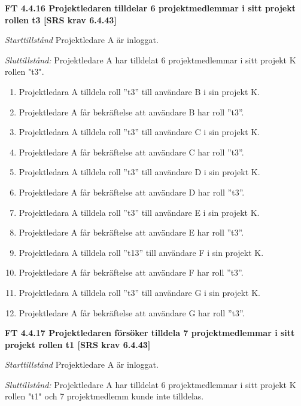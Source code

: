 \documentclass[a4paper]{article}
\begin{document}
\textbf{FT 4.4.16 Projektledaren tilldelar 6 projektmedlemmar i sitt projekt rollen t3 [SRS krav 6.4.43]}

\emph{Starttillstånd} Projektledare A är inloggat.

\emph{Sluttillstånd:} Projektledare A  har tilldelat 6 projektmedlemmar i sitt projekt K rollen "t3".

\begin{enumerate}
\item Projektledara A tilldela roll ”t3” till användare B i sin projekt K. 
\item Projektledare A får bekräftelse att användare B har roll ”t3”.
\item Projektledara A tilldela roll ”t3” till användare C i sin projekt K. 
\item Projektledare A får bekräftelse att användare C har roll ”t3”.
\item Projektledara A tilldela roll ”t3” till användare D i sin projekt K. 
\item Projektledare A får bekräftelse att användare D har roll ”t3”.
\item Projektledara A tilldela roll ”t3” till användare E i sin projekt K. 
\item Projektledare A får bekräftelse att användare E har roll ”t3”.
\item Projektledara A tilldela roll ”t13” till användare F i sin projekt K. 
\item Projektledare A får bekräftelse att användare F har roll ”t3”.
\item Projektledara A tilldela roll ”t3” till användare G i sin projekt K. 
\item Projektledare A får bekräftelse att användare G har roll ”t3”.
\end{enumerate}

\textbf{FT 4.4.17 Projektledaren försöker tilldela 7 projektmedlemmar i sitt projekt rollen t1 [SRS krav 6.4.43]}

\emph{Starttillstånd} Projektledare A är inloggat.

\emph{Sluttillstånd:} Projektledare A  har tilldelat 6 projektmedlemmar i sitt projekt K  rollen "t1" och 7 projektmedlemm kunde inte tilldelas.
\end{document}
